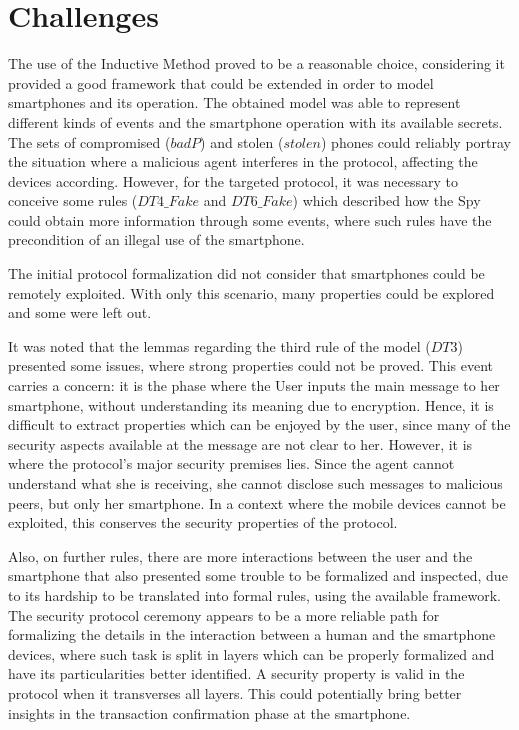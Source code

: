 \section{Challenges}
The use of the Inductive Method proved to be a reasonable choice, considering it provided a good framework that could be extended in order to model smartphones and its operation. The obtained model was able to represent different kinds of events and the smartphone operation with its available secrets. The sets of compromised ($badP$) and stolen ($stolen$) phones could reliably portray the situation where a malicious agent interferes in the protocol, affecting the devices according. However, for the targeted protocol, it was necessary to conceive some rules ($DT4\_Fake$ and $DT6\_Fake$) which described how the Spy could obtain more information through some events, where such rules have the precondition of an illegal use of the smartphone.

The initial protocol formalization did not consider that smartphones could be remotely exploited. With only this scenario, many properties could be explored and some were left out.

It was noted that the lemmas regarding the third rule of the model ($DT3$) presented some issues, where strong properties could not be proved. This event carries a concern: it is the phase where the User inputs the main message to her smartphone, without understanding its meaning due to encryption. Hence, it is difficult to extract properties which can be enjoyed by the user, since many of the security aspects available at the message are not clear to her. However, it is where the protocol's major security premises lies. Since the agent cannot understand what she is receiving, she cannot disclose such messages to malicious peers, but only her smartphone. In a context where the mobile devices cannot be exploited, this conserves the security properties of the protocol.

Also, on further rules, there are more interactions between the user and the smartphone that also presented some trouble to be formalized and inspected, due to its hardship to be translated into formal rules, using the available framework. The security protocol ceremony \cite{Ellison07} appears to be a more reliable path for formalizing the details in the interaction between a human and the smartphone devices, where such task is split in layers which can be properly formalized and have its particularities better identified. A security property is valid in the protocol when it transverses all layers. This could potentially bring better insights in the transaction confirmation phase at the smartphone.


